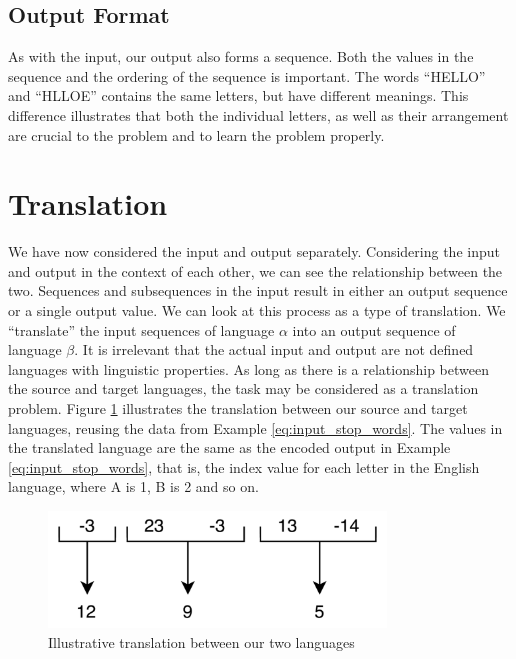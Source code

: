 \subsection{Output Format}
As with the input, our output also forms a sequence. Both the values in the sequence and the ordering of the sequence is important. The words ``HELLO'' and ``HLLOE'' contains the same letters, but have different meanings. This difference illustrates that both the individual letters, as well as their arrangement are crucial to the problem and to learn the problem properly. 


\section{Translation}
\label{sec:translation}
We have now considered the input and output separately. Considering the input and output in the context of each other, we can see the relationship between the two. Sequences and subsequences in the input result in either an output sequence or a single output value. We can look at this process as a type of translation. We ``translate'' the input sequences of language \(\alpha\) into an output sequence of language \(\beta\). It is irrelevant that the actual input and output are not defined languages with linguistic properties. As long as there is a relationship between the source and target languages, the task may be considered as a translation problem. Figure \ref{fig:number_translation} illustrates the translation between our source and target languages, reusing the data from Example \ref{eq:input_stop_words}. The values in the translated language are the same as the encoded output in Example \ref{eq:input_stop_words}, that is, the index value for each letter in the English language, where A is 1, B is 2 and so on.

\begin{figure}[ht]
    \centering
    \includegraphics[width=0.8\textwidth]{fig/background_theory/number_translation.png}
    \caption{Illustrative translation between our two languages}
    \label{fig:number_translation}
\end{figure}

